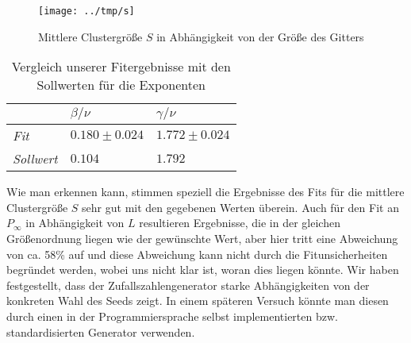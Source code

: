\begin{figure}[htb]
  \centering
  \texttt{[image: ../tmp/s]}
  \caption{Mittlere Clustergröße $S$ in Abhängigkeit von der Größe des Gitters}
  \label{fig:S}
\end{figure}

\begin{table}[htbp]
\centering
\setlength{\tabcolsep}{14pt}
\begin{tabular*}{0.5\columnwidth}{lll}
\toprule
& {$β/ν$} & {$γ/ν$}\\
\midrule
\textit{Fit} & $0.180\pm0.024$ & $1.772\pm0.024$ \\
\textit{Sollwert} & $0.104$ & $1.792$ \\
\bottomrule
\end{tabular*}
\label{tab:res}
\caption{Vergleich unserer Fitergebnisse mit den Sollwerten für die Exponenten}
\end{table}

Wie man erkennen kann, stimmen speziell die Ergebnisse des Fits für die mittlere Clustergröße $S$
sehr gut mit den gegebenen Werten überein. Auch für den Fit an $P_{\infty}$ in Abhängigkeit von
$L$ resultieren Ergebnisse, die in der gleichen Größenordnung liegen wie der gewünschte Wert, aber hier
tritt eine Abweichung von ca. 58\% auf und diese Abweichung kann nicht durch die Fitunsicherheiten begründet werden,
wobei uns nicht klar ist, woran dies liegen könnte. Wir haben
festgestellt, dass der Zufallszahlengenerator starke Abhängigkeiten von der konkreten Wahl des Seeds
zeigt. In einem späteren Versuch könnte man diesen durch einen in der Programmiersprache selbst implementierten
bzw. standardisierten Generator verwenden.
